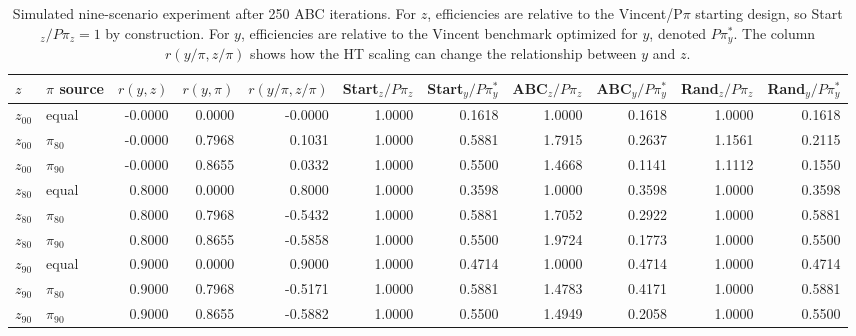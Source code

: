 \begin{table}[!htbp]
\centering
\scriptsize
\caption{Simulated nine-scenario experiment after 250 ABC iterations. For $z$, efficiencies are relative to the Vincent/P$\pi$ starting design, so Start$_z/P\pi_z=1$ by construction. For $y$, efficiencies are relative to the Vincent benchmark optimized for $y$, denoted $P\pi_y^*$. The column $r(y/\pi,z/\pi)$ shows how the HT scaling can change the relationship between $y$ and $z$.}
\label{tab:abc-random-simulated-effz-250}
\begin{tabular}{llrrrrrrrrr}
\hline
$z$ & $\pi$ source & $r(y,z)$ & $r(y,\pi)$ & $r(y/\pi,z/\pi)$ & Start$_z/P\pi_z$ & Start$_y/P\pi_y^*$ & ABC$_z/P\pi_z$ & ABC$_y/P\pi_y^*$ & Rand$_z/P\pi_z$ & Rand$_y/P\pi_y^*$ \\
\hline
$z_{00}$ & equal & -0.0000 & 0.0000 & -0.0000 & 1.0000 & 0.1618 & 1.0000 & 0.1618 & 1.0000 & 0.1618 \\
$z_{00}$ & $\pi_{80}$ & -0.0000 & 0.7968 & 0.1031 & 1.0000 & 0.5881 & 1.7915 & 0.2637 & 1.1561 & 0.2115 \\
$z_{00}$ & $\pi_{90}$ & -0.0000 & 0.8655 & 0.0332 & 1.0000 & 0.5500 & 1.4668 & 0.1141 & 1.1112 & 0.1550 \\
$z_{80}$ & equal & 0.8000 & 0.0000 & 0.8000 & 1.0000 & 0.3598 & 1.0000 & 0.3598 & 1.0000 & 0.3598 \\
$z_{80}$ & $\pi_{80}$ & 0.8000 & 0.7968 & -0.5432 & 1.0000 & 0.5881 & 1.7052 & 0.2922 & 1.0000 & 0.5881 \\
$z_{80}$ & $\pi_{90}$ & 0.8000 & 0.8655 & -0.5858 & 1.0000 & 0.5500 & 1.9724 & 0.1773 & 1.0000 & 0.5500 \\
$z_{90}$ & equal & 0.9000 & 0.0000 & 0.9000 & 1.0000 & 0.4714 & 1.0000 & 0.4714 & 1.0000 & 0.4714 \\
$z_{90}$ & $\pi_{80}$ & 0.9000 & 0.7968 & -0.5171 & 1.0000 & 0.5881 & 1.4783 & 0.4171 & 1.0000 & 0.5881 \\
$z_{90}$ & $\pi_{90}$ & 0.9000 & 0.8655 & -0.5882 & 1.0000 & 0.5500 & 1.4949 & 0.2058 & 1.0000 & 0.5500 \\
\hline
\end{tabular}
\end{table}
